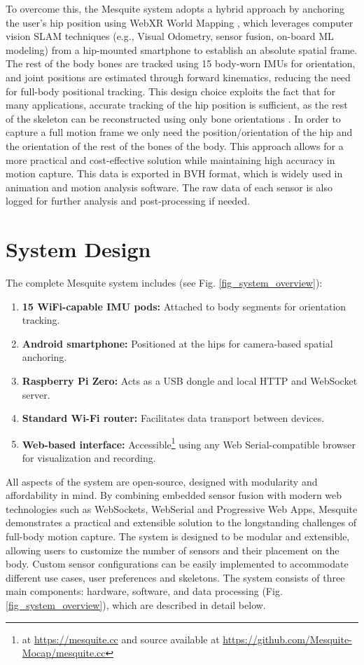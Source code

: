 \documentclass[lettersize,journal]{IEEEtran}
\begin{document}
To overcome this, the Mesquite system adopts a hybrid approach by anchoring the user’s hip position using WebXR World Mapping \cite{webxr, webxr-wm}, which leverages computer vision SLAM techniques (e.g., Visual Odometry, sensor fusion, on-board ML modeling) from a hip-mounted smartphone to establish an absolute spatial frame. The rest of the body bones are tracked using 15 body-worn IMUs for orientation, and joint positions are estimated through forward kinematics, reducing the need for full-body positional tracking. This design choice exploits the fact that for many applications, accurate tracking of the hip position is sufficient, as the rest of the skeleton can be reconstructed using only bone orientations \cite{gonzalez2020}. In order to capture a full motion frame we only need the position/orientation of the hip and the orientation of the rest of the bones of the body. This approach allows for a more practical and cost-effective solution while maintaining high accuracy in motion capture. This data is exported in BVH format, which is widely used in animation and motion analysis software. The raw data of each sensor is also logged for further analysis and post-processing if needed.

\section{System Design}

The complete Mesquite system includes (see Fig. \ref{fig_system_overview}):

\begin{enumerate}
  \item \textbf{15 WiFi-capable IMU pods:} Attached to body segments for orientation tracking.
  \item \textbf{Android smartphone:} Positioned at the hips for camera-based spatial anchoring.
  \item \textbf{Raspberry Pi Zero:} Acts as a USB dongle and local HTTP and WebSocket server.
  \item \textbf{Standard Wi-Fi router:} Facilitates data transport between devices.
  \item \textbf{Web-based interface:} Accessible\footnote{at \url{https://mesquite.cc} and source available at \url{https://github.com/Mesquite-Mocap/mesquite.cc}} using any Web Serial-compatible browser for visualization and recording.
\end{enumerate}

All aspects of the system are open-source, designed with modularity and affordability in mind. By combining embedded sensor fusion with modern web technologies such as WebSockets, WebSerial and Progressive Web Apps, Mesquite demonstrates a practical and extensible solution to the longstanding challenges of full-body motion capture. The system is designed to be modular and extensible, allowing users to customize the number of sensors and their placement on the body. Custom sensor configurations can be easily implemented to accommodate different use cases, user preferences and skeletons. The system consists of three main components: hardware, software, and data processing (Fig. \ref{fig_system_overview}), which are described in detail below.
\end{document}
